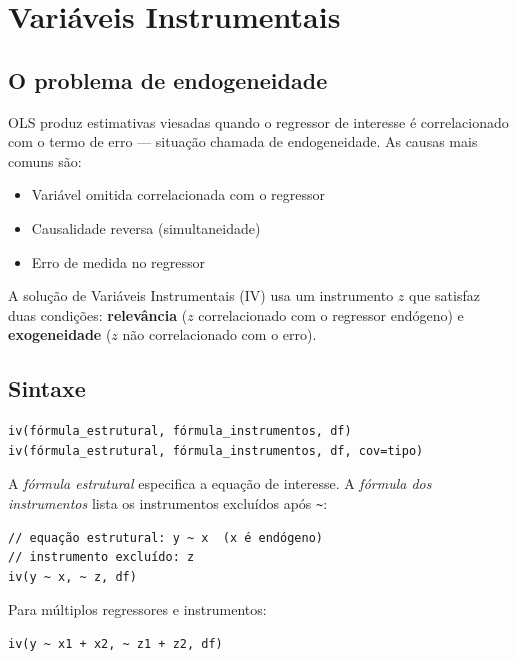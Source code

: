 \chapter{Variáveis Instrumentais}
\label{cap:iv}

\section{O problema de endogeneidade}

OLS produz estimativas viesadas quando o regressor de interesse é correlacionado com
o termo de erro — situação chamada de endogeneidade. As causas mais comuns são:

\begin{itemize}
  \item Variável omitida correlacionada com o regressor
  \item Causalidade reversa (simultaneidade)
  \item Erro de medida no regressor
\end{itemize}

A solução de Variáveis Instrumentais (IV) usa um instrumento $z$ que satisfaz duas
condições: \textbf{relevância} ($z$ correlacionado com o regressor endógeno) e
\textbf{exogeneidade} ($z$ não correlacionado com o erro).

\section{Sintaxe}

\begin{lstlisting}
iv(fórmula_estrutural, fórmula_instrumentos, df)
iv(fórmula_estrutural, fórmula_instrumentos, df, cov=tipo)
\end{lstlisting}

A \textit{fórmula estrutural} especifica a equação de interesse. A
\textit{fórmula dos instrumentos} lista os instrumentos excluídos após \texttt{\textasciitilde}:

\begin{lstlisting}[caption={IV básico — um instrumento}]
// equação estrutural: y ~ x  (x é endógeno)
// instrumento excluído: z
iv(y ~ x, ~ z, df)
\end{lstlisting}

Para múltiplos regressores e instrumentos:

\begin{lstlisting}
iv(y ~ x1 + x2, ~ z1 + z2, df)
\end{lstlisting}

